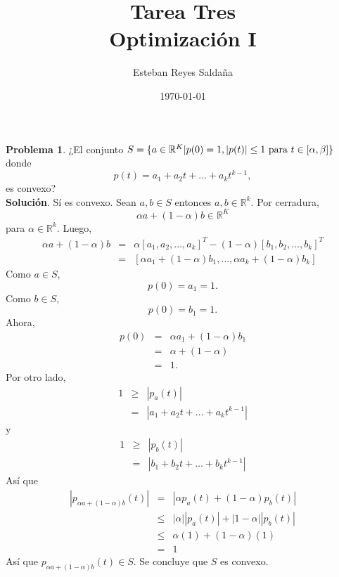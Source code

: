 \documentclass[12pt,letterpaper]{article}
\title{ \textbf{Tarea Tres} \\ Optimización I}
\author{Esteban Reyes Saldaña}
\date{\today}
\theoremstyle{definition}
\newtheorem{problm}{Problema}
\begin{document}
	
\maketitle 
\begin{problm}
		¿El conjunto $ S = \{ a \in \mathbb{R}^K | p(0) = 1, | p(t) | \leq 1 \textup{ para } t \in [\alpha, \beta] \} $ donde 
		\[ p(t) = a_1 + a_2 t + \dots + a_k t^{k-1}, \]
		es convexo?
		\\
		\textbf{Solución}. Sí es convexo. Sean $ a, b \in S $ entonces $ a, b \in \mathbb{R}^k $. Por cerradura,
		\[ \alpha a + (1-\alpha) b \in \mathbb{R}^K \]
		para $ \alpha \in \mathbb{R}^k $. Luego,
		\begin{eqnarray*}
			\alpha a + ( 1 - \alpha) b & = & \alpha [a_1, a_2, \dots, a_k]^T - (1-\alpha) [b_1, b_2, \dots, b_k]^T \\
									   & = & [\alpha a_1 + ( 1 - \alpha) b_1, \dots, \alpha a_k + ( 1 - \alpha) b_k]
		\end{eqnarray*}
		Como $ a \in S $,
		\[ p(0) = a_1 = 1. \]
		Como $ b \in S $,
		\[ p(0) = b_1 = 1. \]
		Ahora,
		\begin{eqnarray*}
			p(0) & = & \alpha a_1 + ( 1- \alpha) b_1 \\
			     & = & \alpha + (1 - \alpha) \\
			     & = & 1.
		\end{eqnarray*}
		Por otro lado,
		\begin{eqnarray*}
			1 & \geq & |p_a (t) | \\
			  &   =  & |a_1 + a_2 t + \dots + a_k t^{k-1} |
		\end{eqnarray*}
		y 
		\begin{eqnarray*}
			1 & \geq & |p_b (t) | \\
			&   =  & |b_1 + b_2 t + \dots + b_k t^{k-1} |
		\end{eqnarray*}
		Así que
		\begin{eqnarray*}
			|p_{\alpha a + (1-\alpha) b}  (t)| & = & |\alpha p_a (t) + (1 - \alpha) p_b (t)| \\
											 & \leq & |\alpha| |p_a (t) | + |1-\alpha| |p_b (t) | \\
											 & \leq & \alpha (1) + (1 - \alpha) (1) \\
											 & = & 1
		\end{eqnarray*}
	Así que $ p_{\alpha a + (1-\alpha) b} (t) \in S $. Se concluye que $ S $ es convexo.
\end{problm}
\end{document}
